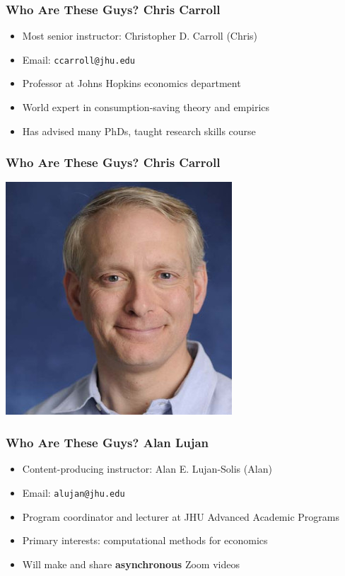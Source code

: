 \documentclass[aspectratio=169]{beamer}
\begin{document}
\begin{frame}
\frametitle{Who Are These Guys? Chris Carroll}
\begin{itemize}
	\item Most senior instructor: Christopher D. Carroll (Chris)
	
	\item Email: \texttt{ccarroll@jhu.edu}
	
	\item Professor at Johns Hopkins economics department
	
	\item World expert in consumption-saving theory and empirics
	
	\item Has advised many PhDs, taught research skills course
\end{itemize}
\end{frame}

\begin{frame}
\frametitle{Who Are These Guys? Chris Carroll}
\centering
\includegraphics[scale=2.0]{../../media/chris-carroll.jpg}
\end{frame}

\begin{frame}
\frametitle{Who Are These Guys? Alan Lujan}
\begin{itemize}
	\item Content-producing instructor: Alan E. Lujan-Solis (Alan)
	
	\item Email: \texttt{alujan@jhu.edu}
	
	\item Program coordinator and lecturer at JHU Advanced Academic Programs
	
	\item Primary interests: computational methods for economics
	
	\item Will make and share \textbf{asynchronous} Zoom videos
\end{itemize}
\end{frame}
\end{document}
